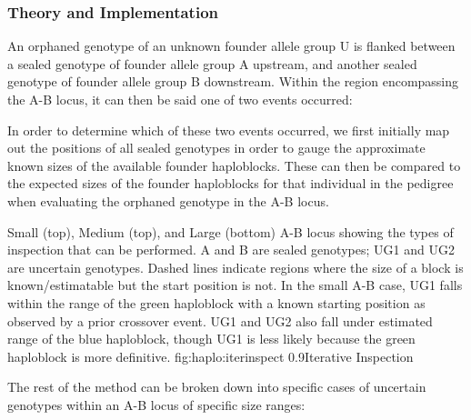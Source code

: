 \subsubsection{Theory and Implementation}

An orphaned genotype of an unknown founder allele group U is flanked between a sealed genotype of founder allele group A upstream, and another sealed genotype of founder allele group B downstream. Within the region encompassing the A-B locus, it can then be said one of two events occurred:

\begin{description}
\end{description}

In order to determine which of these two events occurred, we first initially map out the positions of all sealed genotypes in order to gauge the approximate known sizes of the available founder haploblocks. These can then be compared to the expected sizes of the founder haploblocks for that individual in the pedigree when evaluating the orphaned genotype in the A-B locus.

	{Small (top), Medium (top), and Large (bottom) A-B locus showing the types of inspection that can be performed. A and B are sealed genotypes; UG1 and UG2 are uncertain genotypes. Dashed lines indicate regions where the size of a block is known/estimatable but the start position is not. In the small A-B case, UG1 falls within the range of the green haploblock with a known starting position as observed by a prior crossover event. UG1 and UG2 also fall under estimated range of the blue haploblock, though UG1 is less likely because the green haploblock is more definitive.}
	{fig:haplo:iterinspect}
	{0.9}{Iterative Inspection}

The rest of the method can be broken down into specific cases of uncertain genotypes within an A-B locus of specific size ranges:

